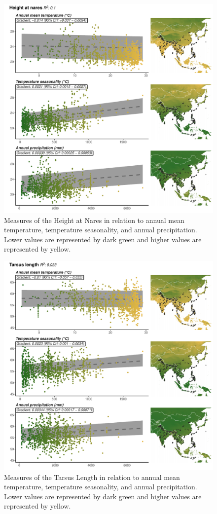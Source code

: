 \documentclass[10pt,a4paper]{article}
\begin{document}
\begin{figure}
\includegraphics[width=0.9\linewidth]{../Figures/climMap_Height.at.nares} \caption{Measures of the Height at Nares in relation to annual mean temperature, temperature seasonality, and annual precipitation. Lower values are represented by dark green and higher values are represented by yellow.}\label{fig:climateComparisonMapHN}
\end{figure}

\begin{figure}
\includegraphics[width=0.9\linewidth]{../Figures/climMap_Tarsus.length} \caption{Measures of the Tarsus Length in relation to annual mean temperature, temperature seasonality, and annual precipitation. Lower values are represented by dark green and higher values are represented by yellow.}\label{fig:climateComparisonMapTL}
\end{figure}
\end{document}
